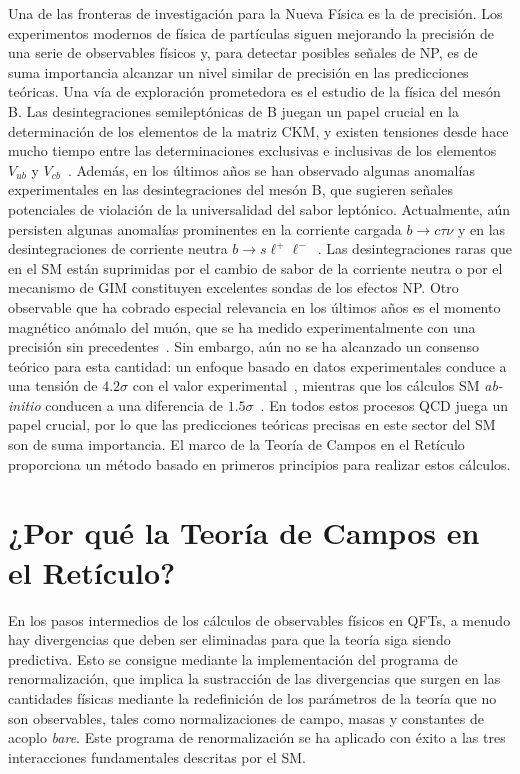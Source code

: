 Una de las fronteras de investigación para la Nueva Física es la de precisión. Los experimentos modernos de física de partículas siguen mejorando la precisión de una serie de observables físicos y, para detectar posibles señales de NP, es de suma importancia alcanzar un nivel similar de precisión en las predicciones teóricas. Una vía de exploración prometedora es el estudio de la física del mesón B. Las desintegraciones semileptónicas de B juegan un papel crucial en la determinación de los elementos de la matriz CKM, y existen tensiones desde hace mucho tiempo entre las determinaciones exclusivas e inclusivas de los elementos $V_{ub}$ y $V_{cb}$~\citep{Ricciardi:2019zph}. Además, en los últimos años se han observado algunas anomalías experimentales en las desintegraciones del mesón B, que sugieren señales potenciales de violación de la universalidad del sabor leptónico. Actualmente, aún persisten algunas anomalías prominentes en la corriente cargada $b\to c\tau\nu$ y en las desintegraciones de corriente neutra $b\to s\ell^+\ell^-$~\citep{Capdevila:2023yhq}. Las desintegraciones raras que en el SM están suprimidas por el cambio de sabor de la corriente neutra o por el mecanismo de GIM constituyen excelentes sondas de los efectos NP. Otro observable que ha cobrado especial relevancia en los últimos años es el momento magnético anómalo del muón, que se ha medido experimentalmente con una precisión sin precedentes~\citep{Muong-2:2006rrc,PhysRevLett.131.161802}. Sin embargo, aún no se ha alcanzado un consenso teórico para esta cantidad: un enfoque basado en datos experimentales conduce a una tensión de $4.2\sigma$ con el valor experimental~\citep{Aoyama:2020ynm}, mientras que los cálculos SM \textit{ab-initio} conducen a una diferencia de $1.5\sigma$~\citep{Borsanyi:2020mff,Kuberski:2024bcj}. En todos estos procesos QCD juega un papel crucial, por lo que las predicciones teóricas precisas en este sector del SM son de suma importancia. El marco de la Teoría de Campos en el Retículo proporciona un método basado en primeros principios para realizar estos cálculos.

\section*{¿Por qué la Teoría de Campos en el Retículo?}

En los pasos intermedios de los cálculos de observables físicos en QFTs, a menudo hay divergencias que deben ser eliminadas para que la teoría siga siendo predictiva. Esto se consigue mediante la implementación del programa de renormalización, que implica la sustracción de las divergencias que surgen en las cantidades físicas mediante la redefinición de los parámetros de la teoría que no son observables, tales como normalizaciones de campo, masas y constantes de acoplo \textit{bare}. Este programa de renormalización se ha aplicado con éxito a las tres interacciones fundamentales descritas por el SM.

